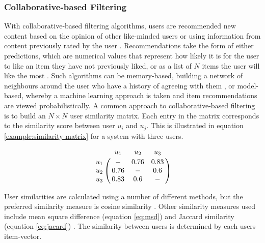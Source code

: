 \subsubsection{Collaborative-based Filtering} 
With collaborative-based filtering algorithms, users are recommended new content based on the opinion of other like-minded users or using information from content previously rated by the user \cite{sarwar2001item}. Recommendations take the form of either predictions, which are numerical values that represent how likely it is for the user to like an item they have not previously liked, or as a list of $N$ items the user will like the most \cite{sarwar2001item}. Such algorithms can be memory-based, building a network of neighbours around the user who have a history of agreeing with them \cite{sarwar2001item}, or model-based, whereby a machine learning approach is taken and item recommendations are viewed probabilistically. A common approach to collaborative-based filtering is to build an $N \times N$ user similarity matrix. Each entry in the matrix corresponds to the similarity score between user $u_i$ and $u_j$. This is illustrated in equation \ref{example:similarity-matrix} for a system with three users. 

\begin{equation}
\bordermatrix{~ & u_1 & u_2 & u_3 \cr
            u_1 & - & 0.76 & 0.83 \cr
            u_2 & 0.76 & - & 0.6\cr
            u_3 & 0.83 & 0.6 & - \cr}
\label{example:similarity-matrix}
\end{equation}

User similarities are calculated using a number of different methods, but the preferred similarity measure is cosine similarity \cite{linden2003amazon, sarwar2001item, liu2014new}. Other similarity measures used include mean square difference (equation \ref{eq:msd}) and Jaccard similarity (equation \ref{eq:jacard}) \cite{liu2014new}. The similarity between users is determined by each users item-vector.

